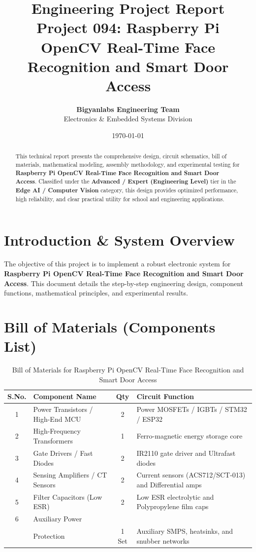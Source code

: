 \documentclass[11pt,a4paper]{article}
\title{\textbf{\Huge Engineering Project Report}\\[0.5em] \Large Project 094: Raspberry Pi OpenCV Real-Time Face Recognition and Smart Door Access}
\author{\textbf{Bigyanlabs Engineering Team}\\ Electronics \& Embedded Systems Division}
\date{\today}
\begin{document}
\maketitle
\thispagestyle{empty}

\begin{abstract}
This technical report presents the comprehensive design, circuit schematics, bill of materials, mathematical modeling, assembly methodology, and experimental testing for \textbf{Raspberry Pi OpenCV Real-Time Face Recognition and Smart Door Access}. Classified under the \textbf{Advanced / Expert (Engineering Level)} tier in the \textbf{Edge AI / Computer Vision} category, this design provides optimized performance, high reliability, and clear practical utility for school and engineering applications.
\end{abstract}

\newpage
\tableofcontents
\newpage

\section{Introduction \& System Overview}
The objective of this project is to implement a robust electronic system for \textbf{Raspberry Pi OpenCV Real-Time Face Recognition and Smart Door Access}. This document details the step-by-step engineering design, component functions, mathematical principles, and experimental results.

\section{Bill of Materials (Components List)}
\begin{table}[h!]
\centering
\caption{Bill of Materials for Raspberry Pi OpenCV Real-Time Face Recognition and Smart Door Access}
\vspace{0.5em}
\begin{tabular}{clcp{7cm}}
\toprule
\textbf{S.No.} & \textbf{Component Name} & \textbf{Qty} & \textbf{Circuit Function} \\
\midrule
1 & Power Transistors / High-End MCU & 2 & Power MOSFETs / IGBTs / STM32 / ESP32 \\
2 & High-Frequency Transformers & 1 & Ferro-magnetic energy storage core \\
3 & Gate Drivers / Fast Diodes & 2 & IR2110 gate driver and Ultrafast diodes \\
4 & Sensing Amplifiers / CT Sensors & 2 & Current sensors (ACS712/SCT-013) and Differential amps \\
5 & Filter Capacitors (Low ESR) & 2 & Low ESR electrolytic and Polypropylene film caps \\
6 & Auxiliary Power \\& Protection & 1 Set & Auxiliary SMPS, heatsinks, and snubber networks \\
\bottomrule
\end{tabular}
\end{table}
\end{document}
